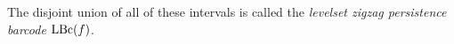The disjoint union of all of these intervals is called the {\em levelset zigzag persistence barcode} $\mathrm{LBc}(f)$.

 


